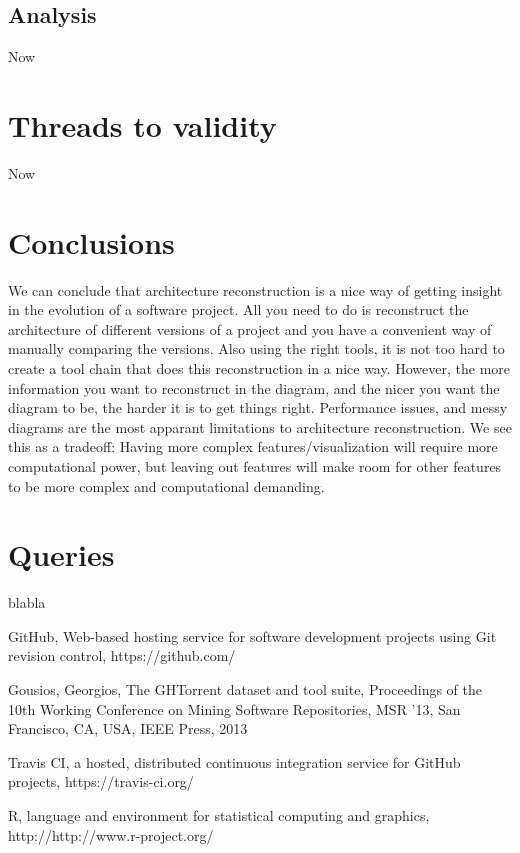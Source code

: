 \documentclass[a4paper,11pt]{article}
\begin{document}
		\subsection{Analysis}
			Now 
			
	\section{Threads to validity}
		Now 
	
	\section{Conclusions}
		We can conclude that architecture reconstruction is a nice way of getting insight in the evolution of a software project. All you need to do is reconstruct the architecture of different versions of a project and you have a convenient way of manually comparing the versions. Also using the right tools, it is not too hard to create a tool chain that does this reconstruction in a nice way. However, the more information you want to reconstruct in the diagram, and the nicer you want the diagram to be, the harder it is to get things right. Performance issues, and messy diagrams are the most apparant limitations to architecture reconstruction. We see this as a tradeoff: Having more complex features/visualization will require more computational power, but leaving out features will make room for other features to be more complex and computational demanding.

	\appendix
	\section{Queries}
		blabla

	\begin{thebibliography}{9}
			GitHub, Web-based hosting service for software development projects using Git revision control, https://github.com/

			Gousios, Georgios, The GHTorrent dataset and tool suite, 
			Proceedings of the 10th Working Conference on Mining Software Repositories, MSR '13,
			San Francisco, CA, USA, IEEE Press, 2013

			Travis CI, a hosted, distributed continuous integration service for GitHub projects, https://travis-ci.org/

			R, language and environment for statistical computing and graphics, http://http://www.r-project.org/
		
	\end{thebibliography}
\end{document}

